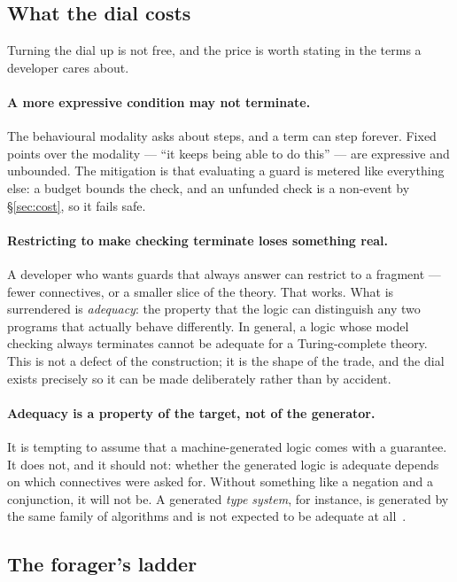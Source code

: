 \subsection{What the dial costs}

Turning the dial up is not free, and the price is worth stating in the terms a
developer cares about.

\paragraph{A more expressive condition may not terminate.} The behavioural
modality asks about steps, and a term can step forever. Fixed points over the
modality --- ``it keeps being able to do this'' --- are expressive and
unbounded. The mitigation is that evaluating a guard is metered like everything
else: a budget bounds the check, and an unfunded check is a non-event by
\S\ref{sec:cost}, so it fails safe.

\paragraph{Restricting to make checking terminate loses something real.} A
developer who wants guards that always answer can restrict to a fragment ---
fewer connectives, or a smaller slice of the theory. That works. What is
surrendered is \emph{adequacy}: the property that the logic can distinguish any
two programs that actually behave differently. In general, a logic whose model
checking always terminates cannot be adequate for a Turing-complete theory. This
is not a defect of the construction; it is the shape of the trade, and the dial
exists precisely so it can be made deliberately rather than by accident.

\paragraph{Adequacy is a property of the target, not of the generator.} It is
tempting to assume that a machine-generated logic comes with a guarantee. It
does not, and it should not: whether the generated logic is adequate depends on
which connectives were asked for. Without something like a negation and a
conjunction, it will not be. A generated \emph{type system}, for instance, is
generated by the same family of algorithms and is not expected to be adequate at
all~\cite{Hypercube,GSLTintro}.

\subsection{The forager's ladder}

